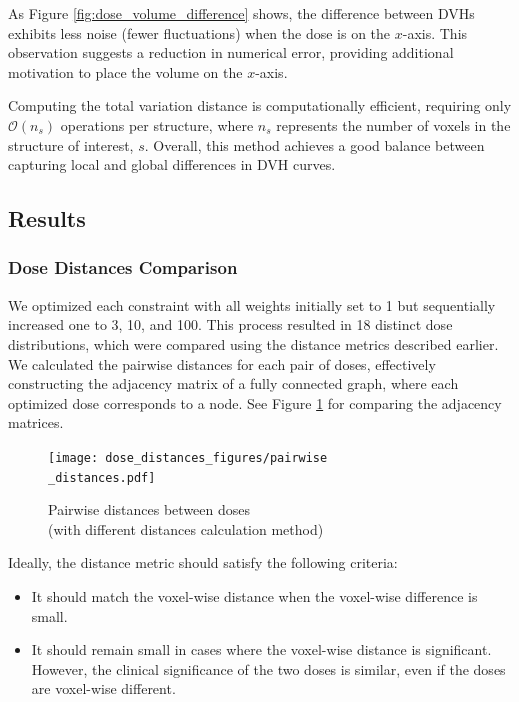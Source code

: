 As Figure \ref{fig:dose_volume_difference} shows, the difference between DVHs exhibits less noise (fewer fluctuations) when the dose is on the $x$-axis.
This observation suggests a reduction in numerical error, providing additional motivation to place the volume on the $x$-axis.

Computing the total variation distance is computationally efficient, requiring only $\mathcal{O}(n_s)$ operations per structure, where $n_s$ represents the number of voxels in the structure of interest, $s$.
Overall, this method achieves a good balance between capturing local and global differences in DVH curves.

\subsection{Results}
\subsubsection{Dose Distances Comparison}
We optimized each constraint with all weights initially set to 1 but sequentially increased one to 3, 10, and 100.
This process resulted in 18 distinct dose distributions, which were compared using the distance metrics described earlier.
We calculated the pairwise distances for each pair of doses, effectively constructing the adjacency matrix of a fully connected graph, where each optimized dose corresponds to a node.
See Figure \ref{fig:pairwise_distances} for comparing the adjacency matrices.
\begin{figure}
	\centering
	\texttt{[image: dose\_distances\_figures/pairwise\\\_distances.pdf]}
	\caption{Pairwise distances between doses\\(with different distances calculation method)}
	\label{fig:pairwise_distances}
\end{figure}

Ideally, the distance metric should satisfy the following criteria:
\begin{itemize}
	\item It should match the voxel-wise distance when the voxel-wise difference is small.
	\item It should remain small in cases where the voxel-wise distance is significant.
	However, the clinical significance of the two doses is similar, even if the doses are voxel-wise different.
\end{itemize}

